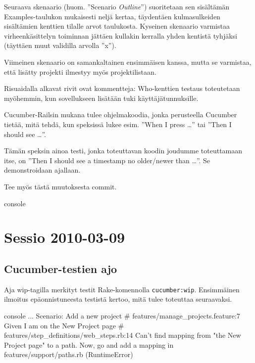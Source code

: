 \documentclass{article}
\newcommand{\pdfforeignlanguage}[2]{\texorpdfstring{\foreignlanguage{#1}{#2}}{#2}}
\newcommand{\eng}[1]{\pdfforeignlanguage{english}{#1}}
\begin{document}
Seuraava skenaario (huom. ''\eng{Scenario \emph{Outline}}'') suoritetaan sen
sisältämän \eng{Examples}-taulukon mukaisesti neljä kertaa, täydentäen
kulmasulkeiden sisältämien kenttien tilalle arvot taulukosta.  Kyseinen
skenaario varmistaa virheenkäsittelyn toiminnan jättäen kullakin kerralla yhden
kentistä tyhjäksi (täyttäen muut validilla arvolla ''x'').

Viimeinen skenaario on samankaltainen ensimmäisen kanssa, mutta se varmistaa,
että lisätty projekti ilmestyy myös projektilistaan.

Risuaidalla alkavat rivit ovat kommentteja: \eng{Who}-kenttien testaus
toteutetaan myöhemmin, kun sovellukseen lisätään tuki käyttäjätunnuksille.

Cucumber-Railsin mukana tulee ohjelmakoodia, jonka perusteella \eng{Cucumber}
tietää, mitä tehdä, kun speksissä lukee esim. ''\eng{When I press \dots''} tai
''\eng{Then I should see \dots}''.

Tämän speksin ainoa testi, jonka toteuttavan koodin joudumme toteuttamaan itse,
on ''\eng{Then I should see a timestamp no older/newer than \dots}''. Se
demonstroidaan ajallaan.

\begin{samepage}
Tee myös tästä muutoksesta commit.

\begin{pygmented}{console}
\end{pygmented}
\end{samepage}

\section{Sessio 2010-03-09}

\subsection{Cucumber-testien ajo}

Aja wip-tagilla merkityt testit Rake-komennolla \texttt{cucumber:wip}.
Ensimmäinen ilmoitus epäonnistuneesta testistä kertoo, mitä tulee toteuttaa
seuraavaksi.

\begin{pygmented}{console}
...
  Scenario: Add a new project                           # features/manage_projects.feature:7
    Given I am on the New Project page                  # features/step_definitions/web_steps.rb:14
      Can't find mapping from "the New Project page" to a path.
      Now, go and add a mapping in features/support/paths.rb (RuntimeError)
\end{pygmented}
\end{document}
